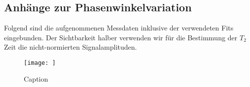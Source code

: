 \documentclass[../main.tex]{subfiles}
\begin{document}
    \subsection{Anhänge zur Phasenwinkelvariation}
        Folgend sind die aufgenommenen Messdaten inklusive der verwendeten Fits eingebunden. Der Sichtbarkeit halber verwenden wir für die Bestimmung der $T_2$ Zeit die nicht-normierten Signalamplituden.
        
        \begin{figure}
            \centering
            \texttt{[image: ]}
            \caption{Caption}
            \label{fig:enter-label}
        \end{figure}
\end{document}
